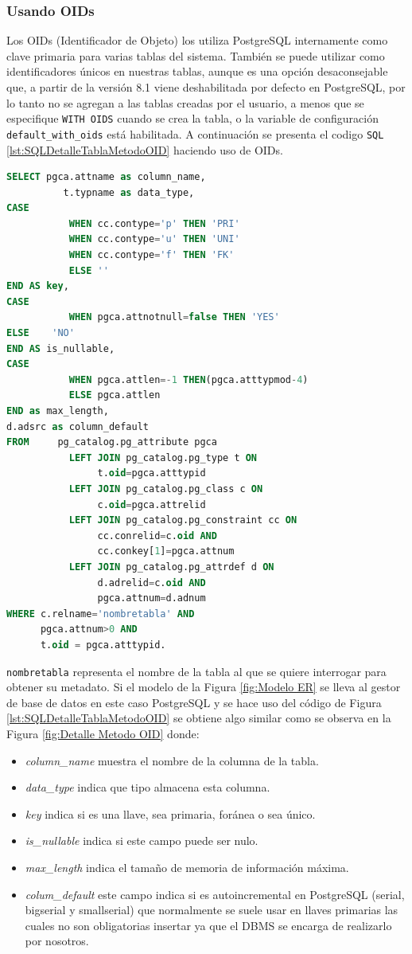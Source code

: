 \subsubsection{Usando OIDs}
Los OIDs (Identificador de Objeto) los utiliza PostgreSQL internamente como clave primaria para varias tablas del sistema. Tambi\'en se puede utilizar como identificadores \'unicos en nuestras tablas, aunque es una opci\'on desaconsejable que, a partir de la versi\'on 8.1 viene deshabilitada por defecto en PostgreSQL, por lo tanto no se agregan a las tablas creadas por el usuario, a menos que se especifique \texttt{WITH OIDS} cuando se crea la tabla, o la variable de configuraci\'on \texttt{default\_with\_oids} est\'a habilitada.
A continuaci\'on se presenta el codigo \texttt{SQL} \ref{lst:SQLDetalleTablaMetodoOID} haciendo uso de OIDs.
\begin{lstlisting}[caption={Query para obtener detalle tabla con OIDs},label={lst:SQLDetalleTablaMetodoOID},language=sql]
SELECT pgca.attname as column_name,
	      t.typname as data_type,
CASE
		   WHEN cc.contype='p' THEN 'PRI'
		   WHEN cc.contype='u' THEN 'UNI'
		   WHEN cc.contype='f' THEN 'FK'
		   ELSE '' 
END AS key,	
CASE 
		   WHEN pgca.attnotnull=false THEN 'YES' 
ELSE    'NO' 
END AS is_nullable,
CASE 
		   WHEN pgca.attlen=-1 THEN(pgca.atttypmod-4) 
		   ELSE pgca.attlen 
END as max_length,
d.adsrc as column_default
FROM	 pg_catalog.pg_attribute pgca
		   LEFT JOIN pg_catalog.pg_type t ON
			    t.oid=pgca.atttypid
		   LEFT JOIN pg_catalog.pg_class c ON
			    c.oid=pgca.attrelid
		   LEFT JOIN pg_catalog.pg_constraint cc ON 
			    cc.conrelid=c.oid AND 
			    cc.conkey[1]=pgca.attnum
		   LEFT JOIN pg_catalog.pg_attrdef d ON
			    d.adrelid=c.oid AND 
			    pgca.attnum=d.adnum
WHERE c.relname='nombretabla' AND
	  pgca.attnum>0 AND
	  t.oid = pgca.atttypid.
\end{lstlisting}
\texttt{nombretabla} representa el nombre de la tabla al que se quiere interrogar para obtener su metadato.
Si el modelo de la Figura \ref{fig:Modelo ER} se lleva al gestor de base de datos en este caso PostgreSQL y  se hace uso del c\'odigo de Figura \ref{lst:SQLDetalleTablaMetodoOID} se obtiene algo similar como se observa en la Figura \ref{fig:Detalle Metodo OID} donde:
\begin{itemize}
\item \emph{column\_name} muestra el nombre de la columna de la tabla.
\item \emph{data\_type} indica que tipo almacena esta columna.
\item \emph{key} indica si es una llave, sea primaria, for\'anea o sea \'unico.
\item \emph{is\_nullable} indica si este campo puede ser nulo.
\item \emph{max\_length} indica el tama\~no de memoria de informaci\'on m\'axima.
\item \emph{colum\_default} este campo indica si es autoincremental en PostgreSQL (serial, bigserial y smallserial) que normalmente se suele usar en llaves primarias las cuales no son obligatorias insertar ya que el DBMS se encarga de realizarlo por nosotros.
\end{itemize}
